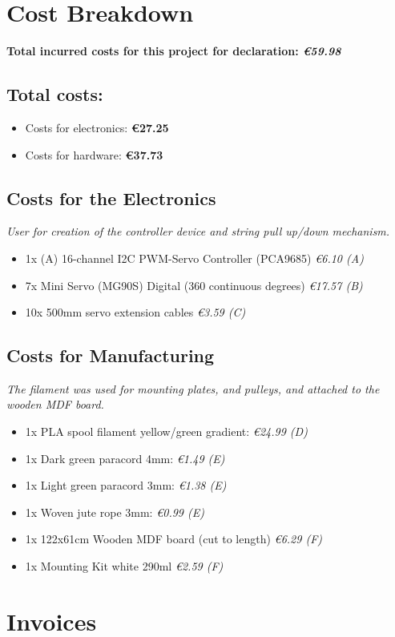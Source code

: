 \documentclass[a4paper]{article}
\begin{document}
\section*{Cost Breakdown}

\textbf{Total incurred costs for this project for declaration: \textit{€59.98}}

\subsection*{Total costs:}
\begin{itemize}
    \item Costs for electronics: \textbf{€27.25}
    \item Costs for hardware: \textbf{€37.73}
\end{itemize}

\subsection*{Costs for the Electronics}

\textit{User for creation of the controller device and string pull up/down mechanism.}

\begin{itemize}
    \item 1x \texti(A) 16-channel I2C PWM-Servo Controller (PCA9685) \textit{€6.10 (A)}
    \item 7x Mini Servo (MG90S) Digital (360 continuous degrees) \textit{€17.57 (B)}
    \item 10x 500mm servo extension cables \textit{€3.59 (C)}

\end{itemize}

\subsection*{Costs for Manufacturing}

\textit{The filament was used for mounting plates, and pulleys, and attached to the wooden MDF board.}

\begin{itemize}
    \item 1x PLA spool filament yellow/green gradient: \textit{€24.99 (D)}
    \item 1x Dark green paracord 4mm: \textit{€1.49 (E)} 
    \item 1x Light green paracord 3mm: \textit{€1.38 (E)} 
    \item 1x Woven jute rope 3mm: \textit{€0.99 (E)} 
    \item 1x 122x61cm Wooden MDF board (cut to length) \textit{€6.29 (F)} 
    \item 1x Mounting Kit white 290ml \textit{€2.59 (F)} 
\end{itemize}

\section*{Invoices}
\end{document}
